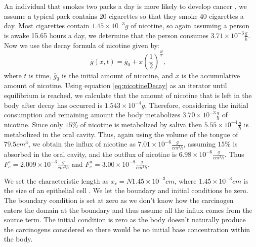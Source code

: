 \documentclass[\main/thesis.tex]{subfiles}
\begin{document}
An individual that smokes two packs a day is more likely to develop cancer \cite{merckmanuals.com_2021}, we assume a typical pack contains 20 cigarettes so that they smoke 40 cigarettes a day. Most cigarettes contain $1.45{\times}10^{\minus 3} g$ of nicotine, so again assuming a person is awake 15.65 hours a day, we determine that the person consumes $3.71{\times}10^{\minus 3} \frac{g}{h}$. Now we use the decay formula of nicotine given by:
\begin{equation}
    \overline{g}(x, t) {=} \overline{g}_0 {+} x \left( \frac{1}{2} \right)^{\frac{2t}{3}},
    \label{eq:nicotineDecay}
\end{equation}
where $t$ is time, $\overline{g}_0$ is the initial amount of nicotine, and $x$ is the accumulative amount of nicotine. Using equation \eqref{eq:nicotineDecay} as an iterator until equilibrium is reached, we calculate that the amount of nicotine that is left in the body after decay has occurred is $1.543{\times}10^{\minus 4} g$. Therefore, considering the initial consumption and remaining amount the body metabolizes $3.70{\times}10^{\minus 3} \frac{g}{h}$ of nicotine. 
Since only $15\%$ of nicotine is metabolized by saliva then $5.55{\times}10^{\minus 4} \frac{g}{h}$ is metabolized in the oral cavity. Thus, again using the volume of the tongue of $79.5cm^3$, we obtain the influx of nicotine as $7.01{\times}10^{-6} \frac{g}{cm^3 h}$, assuming $15\%$ is absorbed in the oral cavity, and the outflux of nicotine is $6.98{\times}10^{-6} \frac{g}{cm^3 h}$. Thus $F_c^e {=} 2.009 {\times} 10^{\minus 3} \frac{g}{cm^3 h}$ and $F_c^n {=} 3.00 {\times}10^{\minus 8} \frac{g}{cm^3 h}$.

We set the characteristic length as $x_c {=} N 1.45{\times}10^{-3} cm$, where \newline $1.45{\times}10^{-3} cm$ is the size of an epithelial cell \cite{bionumbers.hms.harvard.edu_2022}. We let the boundary and initial conditions be zero. The boundary condition is set at zero as we don't know how the carcinogen enters the domain at the boundary and thus assume all the influx comes from the source term. The initial condition is zero as the body doesn't naturally produce the carcinogens considered so there would be no initial base concentration within the body.  
\end{document}
